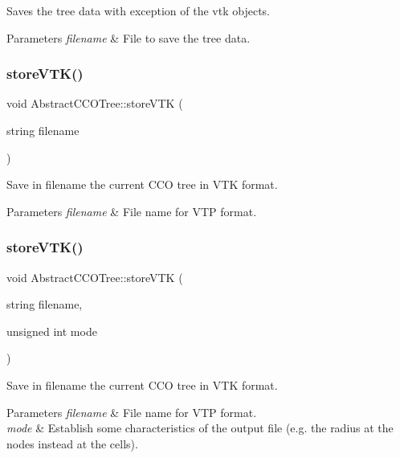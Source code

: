 Saves the tree data with exception of the vtk objects. 
\begin{DoxyParams}{Parameters}
{\em filename} & File to save the tree data. \\
\hline
\end{DoxyParams}
\mbox{\label{class_abstract_c_c_o_tree_a4971f9dcca23a0d0fbf3781535f13f43}} 
\subsubsection{\texorpdfstring{store\+V\+T\+K()}{storeVTK()}\hspace{0.1cm}{\footnotesize\ttfamily [1/2]}}
{\footnotesize\ttfamily void Abstract\+C\+C\+O\+Tree\+::store\+V\+TK (\begin{DoxyParamCaption}\item[{string}]{filename }\end{DoxyParamCaption})}

Save in {\ttfamily filename} the current C\+CO tree in V\+TK format. 
\begin{DoxyParams}{Parameters}
{\em filename} & File name for V\+TP format. \\
\hline
\end{DoxyParams}
\mbox{\label{class_abstract_c_c_o_tree_af1c9afa4526be184cb4cf0cb20d387b1}} 
\subsubsection{\texorpdfstring{store\+V\+T\+K()}{storeVTK()}\hspace{0.1cm}{\footnotesize\ttfamily [2/2]}}
{\footnotesize\ttfamily void Abstract\+C\+C\+O\+Tree\+::store\+V\+TK (\begin{DoxyParamCaption}\item[{string}]{filename,  }\item[{unsigned int}]{mode }\end{DoxyParamCaption})}

Save in {\ttfamily filename} the current C\+CO tree in V\+TK format. 
\begin{DoxyParams}{Parameters}
{\em filename} & File name for V\+TP format. \\
\hline
{\em mode} & Establish some characteristics of the output file (e.\+g. the radius at the nodes instead at the cells). \\
\hline
\end{DoxyParams}
\mbox{\label{class_abstract_c_c_o_tree_a397e54eeaf1d82eee142364f34dd36bb}} 
